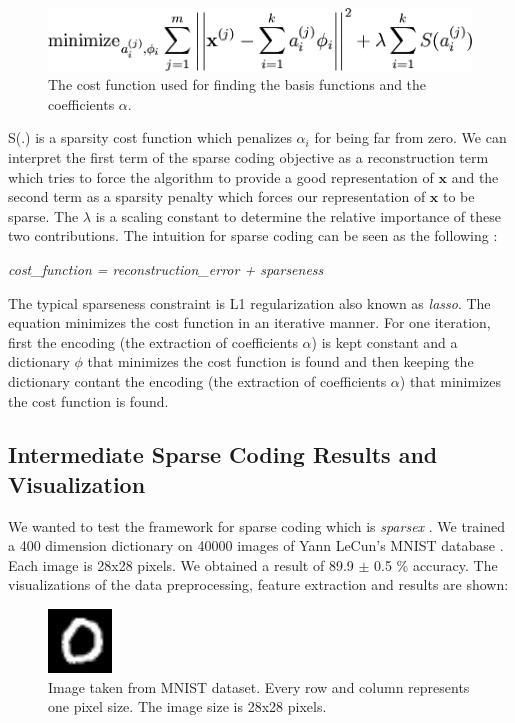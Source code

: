 \documentclass[	DIV=calc,%
				paper=a4,%
				fontsize=11pt,%
				twocolumn]{scrartcl}	 %
\begin{document}
\begin{figure}[H]
    \centering
    \includegraphics[width=0.8\linewidth]{data/sc_data/sc_equation.png}
    \caption{The cost function used for finding the basis functions and the coefficients $\alpha$.}
    \label{cnn_results_4.png}
\end{figure}

S(.) is a sparsity cost function which penalizes $\alpha_{i}$ for being far from zero. We can interpret the first term of the sparse coding objective as a reconstruction term which tries to force the algorithm to provide a good representation of $\mathbf{x}$ and the second term as a sparsity penalty which forces our representation of $\mathbf{x}$ to be sparse. The $\lambda$ is a scaling constant to determine the relative importance of these two contributions. The intuition for sparse coding can be seen as the following \cite{olshausen_1997} :

\textit{cost\_function = reconstruction\_error + sparseness} 

\noindent The typical sparseness constraint is L1 regularization also known as \textit{lasso}. The equation minimizes the cost function in an iterative manner. For one iteration, first the encoding (the extraction of coefficients $\alpha$) is kept constant and a dictionary $\phi$ that minimizes the cost function is found and then keeping the dictionary contant the encoding (the extraction of coefficients $\alpha$) that minimizes the cost function is found.


\subsection*{Intermediate Sparse Coding Results and Visualization}
We wanted to test the framework for sparse coding which is \textit{sparsex} \cite{sparsex}. We trained a 400 dimension dictionary on 40000 images of Yann LeCun's MNIST database \cite{mnist}. Each image is 28x28 pixels. We obtained a result of 89.9  $\pm$ 0.5 \% accuracy. The visualizations of the data preprocessing, feature extraction and results are shown:

\begin{figure}[H]
    \centering
    \includegraphics[width=0.45\linewidth]{data/sc_data/sc_mnist_image.jpg}
    \caption{Image taken from MNIST dataset. Every row and column represents one pixel size. The image size is 28x28 pixels.}
    \label{sc_mnist_image}
\end{figure}
\end{document}
